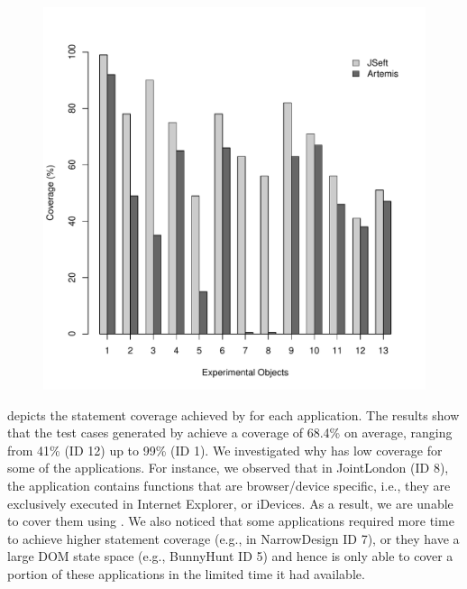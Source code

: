 \begin{figure}[!t]
  \centering
  \includegraphics[width=0.7\hsize]{r-scripts/barplot_coverage}
  \label{Fig:coverage-graph}
\end{figure}


 depicts the statement coverage achieved by \tool for each application. The results show that the test cases generated by \tool achieve a coverage of 68.4\% on average, ranging from 41\% (ID 12) up to 99\% (ID 1).
We investigated why \tool has low coverage for some of the applications. For instance, we observed that in JointLondon (ID 8), the application contains \javascript functions that are browser/device specific, i.e., they are exclusively executed in Internet Explorer, or iDevices. As a result, we are unable to cover them using \tool. 
We also noticed that some applications required more time to achieve higher statement coverage (e.g., in NarrowDesign ID 7), or they have a large DOM state space (e.g., BunnyHunt ID 5) and hence \tool is only able to cover a portion of these applications in the limited time it had available.

